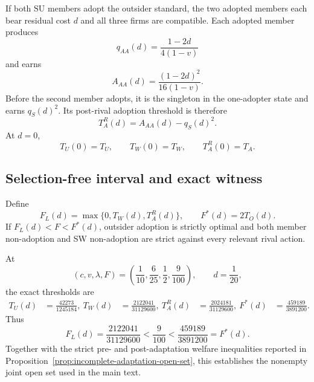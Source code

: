 If both SU members adopt the outsider standard, the two adopted members each bear residual cost $d$ and all three firms are compatible. Each adopted member produces
\begin{equation}
q_{AA}(d)=\frac{1-2d}{4(1-v)}
\end{equation}
and earns
\begin{equation}
A_{AA}(d)=\frac{(1-2d)^2}{16(1-v)}.
\end{equation}
Before the second member adopts, it is the singleton in the one-adopter state and earns $q_S(d)^2$. Its post-rival adoption threshold is therefore
\begin{equation}
T_A^R(d)=A_{AA}(d)-q_S(d)^2.
\label{eq:appendix-TARd}
\end{equation}
At $d=0$,
\[
T_U(0)=T_U,
\qquad
T_W(0)=T_W,
\qquad
T_A^R(0)=T_A.
\]

\subsection{Selection-free interval and exact witness}

Define
\[
F_L(d)=\max\{0,T_W(d),T_A^R(d)\},
\qquad
F^*(d)=2T_O(d).
\]
If $F_L(d)<F<F^*(d)$, outsider adoption is strictly optimal and both member non-adoption and SW non-adoption are strict against every relevant rival action.

At
\[
(c,v,\lambda,F)
=
\left(
\frac1{10},
\frac6{25},
\frac12,
\frac9{100}
\right),
\qquad
d=\frac1{20},
\]
the exact thresholds are
\begin{align}
T_U(d)&=\frac{42273}{1245184},\
T_W(d)&=\frac{2122041}{31129600},\
T_A^R(d)&=\frac{2024181}{31129600},\
F^*(d)&=\frac{459189}{3891200}.
\end{align}
Thus
\[
F_L(d)
=
\frac{2122041}{31129600}
<
\frac9{100}
<
\frac{459189}{3891200}
=
F^*(d).
\]
Together with the strict pre- and post-adaptation welfare inequalities reported in Proposition~\ref{prop:incomplete-adaptation-open-set}, this establishes the nonempty joint open set used in the main text.
